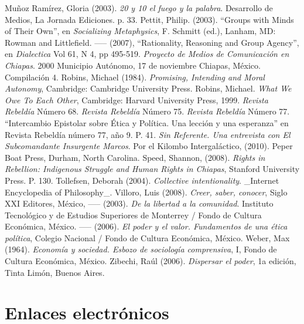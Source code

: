 \documentclass[oneside]{book}
\begin{document}
\begin{thebibliography}{99}
 Muñoz Ramírez, Gloria (2003). \textit{20 y 10 el fuego y la palabra}. Desarrollo de Medios, La Jornada Ediciones. p. 33.
 Pettit, Philip. (2003). “Groups with Minds of Their Own”, en \textit{Socializing Metaphysics}, F. Schmitt (ed.), Lanham, MD: Rowman and Littlefield.
 ----- (2007), “Rationality, Reasoning and Group Agency”,  en \textit{Dialectica} Vol 61, N 4, pp 495-519.
 \textit{Proyecto de Medios de Comunicación en Chiapas}. 2000 Municipio Autónomo, 17 de noviembre Chiapas, México. Compilación 4.
 Robins, Michael (1984). \textit{Promising, Intending and Moral Autonomy}, Cambridge: Cambridge University Press. 
 Robins, Michael. \textit{What We Owe To Each Other}, Cambridge: Harvard University Press, 1999.
 \textit{Revista Rebeldía} Número 68.
 \textit{Revista Rebeldía} Número 75.
 \textit{Revista Rebeldía} Número 77. “Intercambio Epistolar sobre Ética y Política. Una lección y una esperanza” en Revista Rebeldía número 77, año 9. P. 41.
 \textit{Sin Referente. Una entrevista con El Subcomandante Insurgente Marcos}. Por el Kilombo Intergaláctico, (2010).  Peper Boat Press, Durham, North Carolina.
 Speed, Shannon, (2008). \textit{Rights in Rebellion: Indigenous Struggle and Human Rights in Chiapas}, Stanford University Press. P. 130.
 Tollefsen, Deborah (2004). \textit{Collective intentionality}. \_Internet Encyclopedia of Philosophy\_.
 Villoro, Luis (2008). \textit{Creer, saber, conocer}, Siglo XXI Editores, México, 
 ----- (2003). \textit{De la libertad a la comunidad}. Instituto Tecnológico y de Estudios Superiores de Monterrey / Fondo de Cultura Económica, México.
 ----- (2006). \textit{El poder y el valor. Fundamentos de una ética política}, Colegio Nacional / Fondo de Cultura Económica, México.
 Weber, Max (1964). \textit{Economía y sociedad. Esbozo de sociología comprensiva}, I, Fondo de Cultura Económica, México.
 Zibechi, Raúl (2006). \textit{Dispersar el poder}, 1a edición, Tinta Limón, Buenos Aires.

\end{thebibliography}

\chapter*{Enlaces electrónicos}
\end{document}
